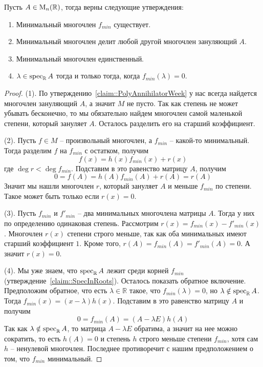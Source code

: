 \begin{claim}
\label{claim::MinPoly}
Пусть $A\in \operatorname{M}_{n}(\mathbb R)$, тогда верны следующие утверждения:
\begin{enumerate}
\item Минимальный многочлен $f_{min}$ существует.

\item Минимальный многочлен делит любой другой многочлен зануляющий $A$.

\item Минимальный многочлен единственный.

\item $\lambda\in\operatorname{spec}_\mathbb R A$ тогда и только тогда, когда $f_{min}(\lambda) = 0$.
\end{enumerate}
\end{claim}
\begin{proof}
(1).
По утверждению~\ref{claim::PolyAnnihilatorWeek} у нас всегда найдется многочлен зануляющий $A$, а значит $M$ не пусто.
Так как степень не может убывать бесконечно, то мы обязательно найдем многочлен самой маленькой степени, который зануляет $A$.
Осталось разделить его на старший коэффициент.

(2).
Пусть $f\in M$ -- произвольный многочлен, а $f_{min}$ -- какой-то минимальный.
Тогда разделим $f$ на $f_{min}$ с остатком, получим 
\[
f(x) = h(x)f_{min}(x) + r(x)
\]
где $\deg r < \deg f_{min}$.
Подставим в это равенство матрицу $A$, получим
\[
0 = f(A) = h(A)f_{min}(A) + r(A) = r(A)
\]
Значит мы нашли многочлен $r$, который зануляет $A$ и меньше $f_{min}$ по степени.
Такое может быть только если $r(x) = 0$.

(3).
Пусть $f_{min}$ и $f'_{min}$ -- два минимальных многочлена матрицы $A$.
Тогда у них по определению одинаковая степень.
Рассмотрим $r(x) = f_{min}(x) - f'_{min}(x)$.
Многочлен $r(x)$ степени строго меньше, так как оба минимальных имеют старший коэффициент $1$.
Кроме того, $r(A) = f_{min }(A) = f'_{min}(A) = 0$.
А значит $r(x) = 0$.

(4).
Мы уже знаем, что $\operatorname{spec}_\mathbb RA$ лежит среди корней $f_{min}$ (утверждение~\ref{claim::SpecInRoots}).
Осталось показать обратное включение.
Предположим обратное, что есть $\lambda\in \mathbb R$ такое, что $f_{min}(\lambda) = 0$, но $\lambda\notin\operatorname{spec}_\mathbb RA$.
Тогда $f_{min}(x) = (x-\lambda)h(x)$.
Подставим в это равенство матрицу $A$ и получим 
\[
0 = f_{min}(A) = (A - \lambda E)h(A)
\]
Так как $\lambda\notin\operatorname{spec}_\mathbb R A$, то матрица $A-\lambda E$ обратима, а значит на нее можно сократить, то есть $h(A) = 0$ и степень $h$ строго меньше степени $f_{min}$, хотя сам $h$ -- ненулевой многочлен.
Последнее противоречит с нашим предположением о том, что $f_{min}$ минимальный.
\end{proof}

